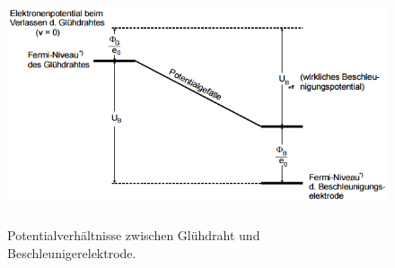 \begin{figure}[H]
	\centering
	\includegraphics[height=7cm]{picture/Kontakt}
	\caption{Potentialverhältnisse zwischen Glühdraht und Beschleunigerelektrode. \cite[5]{sample}}
	\label{fig:Kontakt}
\end{figure}

